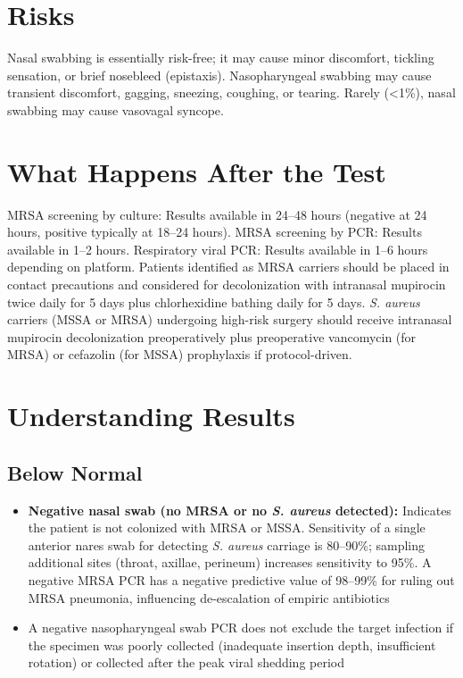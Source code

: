 \section*{Risks}
Nasal swabbing is essentially risk-free; it may cause minor discomfort, tickling sensation, or brief nosebleed (epistaxis). Nasopharyngeal swabbing may cause transient discomfort, gagging, sneezing, coughing, or tearing. Rarely (<1\%), nasal swabbing may cause vasovagal syncope.

\section*{What Happens After the Test}
MRSA screening by culture: Results available in 24--48 hours (negative at 24 hours, positive typically at 18--24 hours). MRSA screening by PCR: Results available in 1--2 hours. Respiratory viral PCR: Results available in 1--6 hours depending on platform. Patients identified as MRSA carriers should be placed in contact precautions and considered for decolonization with intranasal mupirocin twice daily for 5 days plus chlorhexidine bathing daily for 5 days. \textit{S. aureus} carriers (MSSA or MRSA) undergoing high-risk surgery should receive intranasal mupirocin decolonization preoperatively plus preoperative vancomycin (for MRSA) or cefazolin (for MSSA) prophylaxis if protocol-driven.

\section*{Understanding Results}

\subsection*{Below Normal}
\begin{itemize}
  \item \textbf{Negative nasal swab (no MRSA or no \textit{S. aureus} detected):} Indicates the patient is not colonized with MRSA or MSSA. Sensitivity of a single anterior nares swab for detecting \textit{S. aureus} carriage is 80--90\%; sampling additional sites (throat, axillae, perineum) increases sensitivity to 95\%. A negative MRSA PCR has a negative predictive value of 98--99\% for ruling out MRSA pneumonia, influencing de-escalation of empiric antibiotics
  \item A negative nasopharyngeal swab PCR does not exclude the target infection if the specimen was poorly collected (inadequate insertion depth, insufficient rotation) or collected after the peak viral shedding period
\end{itemize}

